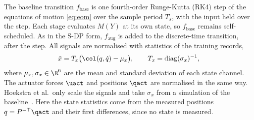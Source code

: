 The baseline transition $f_{\mathrm{base}}$ is one fourth-order Runge-Kutta
(RK4) step of the equations of motion \eqref{eq:eom} over the sample period
$T_s$, with the input held over the step.
Each stage evaluates $M(Y)$ at its own state, so $f_{\mathrm{base}}$ remains
self-scheduled.
As in the S-DP form, $f_{\mathrm{aug}}$ is added to the discrete-time
transition, after the step.
All signals are normalised with statistics of the training records,
\begin{equation}
 \tilde x=T_x\bigl(\col(q,\dot q)-\mu_x\bigr),\qquad
 T_x=\operatorname{diag}(\sigma_x)^{-1},
 \label{eq:aug_norm}
\end{equation}
where $\mu_x,\sigma_x\in\R^6$ are the mean and standard deviation of each
state channel.
The actuator forces $\uact$ and positions $\qact$ are normalised in the same
way.
Hoekstra et al.\ only scale the signals and take $\sigma_x$ from a simulation
of the baseline~\cite[Sec.~5.3]{hoekstra2026lfr}.
Here the state statistics come from the measured positions $q=P^{-\top}\qact$
and their first differences, since no state is measured.


